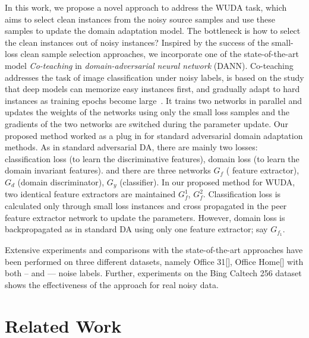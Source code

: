 In this work, we propose a novel approach to address the WUDA task, which aims to select clean instances from the noisy source samples and use these samples to update the domain adaptation model. 
The bottleneck is how to select the clean instances out of noisy instances?
Inspired by the success of the small-loss clean sample selection approaches, we incorporate one of the state-of-the-art model \textit{Co-teaching}\cite{coteaching} in \textit{domain-adversarial neural network} (DANN)\cite{dann}. 
Co-teaching addresses the task of image classification under noisy labels, is based on the study that deep models can memorize easy instances first, and gradually adapt to hard instances as training epochs become large~\cite{memorization}. 
It trains two networks in parallel and updates the weights of the networks using only the small loss samples and the gradients of the two networks are switched during the parameter update. 
Our proposed method worked as a plug in for standard adversarial domain adaptation methods.
As in standard adversarial DA, there are mainly two losses: classification loss (to learn the discriminative features), domain loss (to learn the domain invariant features). and there are three networks $G_f$ ( feature extractor), $G_d$ (domain discriminator), $G_y$ (classifier). In our proposed method for WUDA, two identical feature extractors are maintained $G_{f}^1$, $G_{f}^2$. Classification loss is calculated only through small loss instances and cross propagated in the peer feature extractor network to update the parameters. However, domain loss is backpropagated as in standard DA using only one feature extractor; say $G_{f_{1}}$.

Extensive experiments and comparisons with the state-of-the-art approaches have been performed on three different datasets, namely Office 31[], Office Home[] with both -- and --- noise labels.
Further, experiments on the Bing Caltech 256 dataset shows the effectiveness of the approach for real noisy data. 


\section{Related Work}
